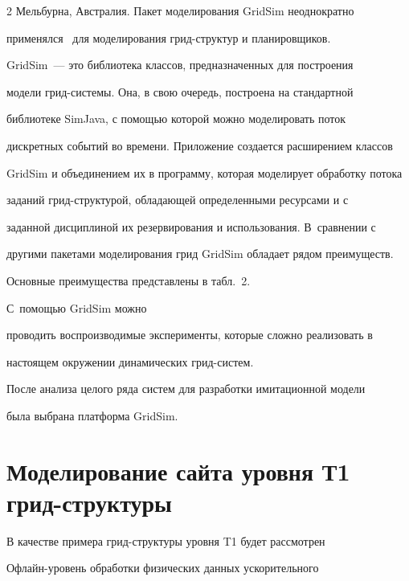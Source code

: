 \begin{multicols}{2}
Мельбурна, Австралия. Пакет моделирования GridSim неоднократно 


применялся~\cite{6-kor} для моделирования грид-струк\-тур и планировщиков.


   


   GridSim~--- это библиотека классов, предназначенных для построения 


модели грид-системы. Она, в свою очередь, построена на стандартной 


библиотеке SimJava, с помощью которой можно моделировать поток 


дискретных событий во времени. Приложение создается расширением классов 


GridSim и объединением их в программу, которая моделирует обработку потока 


заданий грид-струк\-ту\-рой, обладающей определенными ресурсами и с 


заданной дисциплиной их резервирования и использования. В~сравнении с 


другими пакетами моделирования грид GridSim обладает рядом преимуществ. 


Основные преимущества представлены в табл.~2. 





С~по\-мощью GridSim можно 


проводить воспроизводимые эксперименты, которые сложно реализовать в 


настоящем окружении динамических грид-сис\-тем.


   








   После анализа целого ряда систем для разработки имитационной модели 


была выбрана платформа GridSim. 


  


\section{Моделирование сайта уровня Т1 грид-структуры}





   В качестве примера грид-струк\-ту\-ры уровня T1 будет рассмотрен 


   Оф\-лайн-уро\-вень обработки физических данных ускорительного 



\end{multicols}
